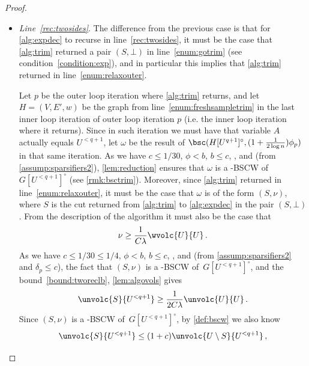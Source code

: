 \begin{proof}
\begin{itemize}
		\item \emph{Line~\eqref{rec:twosides}}. The difference from the previous case is that for \cref{alg:expdec} to recurse in line~\eqref{rec:twosides}, it must be the case that \cref{alg:trim} returned a pair $(S,\bot)$ in line~\eqref{enum:gotrim} (see condition~\eqref{condition:exp}), and in particular this implies that \cref{alg:trim} returned in line~\eqref{enum:relaxouter}.
		
		Let $p$ be the outer loop iteration where \cref{alg:trim} returns, and let $H=(V,E',w)$ be the graph from line~\eqref{enum:freshsampletrim} in the last inner loop iteration of outer loop iteration $p$ (i.e. the inner loop iteration where it returns). Since in such iteration we must have that variable $A$ actually equals $U^{<q+1} $, let $\omega$ be the result of $\bsc(H[U^{q+1}]^\circ, (1+\frac{1}{2 \log n})\phi_{p})$ in that same iteration.
		As we have $ c \le 1/30$, $\phi < b$, $b \le c$, , and  (from \cref{assump:sparsifiers2}), \cref{lem:reduction} ensures that $\omega$ is a -BSCW of~$G[U^{<q+1}]^\circ$ (see \cref{rmk:bsctrim}). Moreover, since \cref{alg:trim} returned in line~\eqref{enum:relaxouter}, it must be the case that $\omega$ is of the form $(S,\nu)$, where $S$ is the cut returned from \cref{alg:trim} to \cref{alg:expdec} in the pair $(S,\bot)$. From the description of the algorithm it must also be the case that
		\begin{equation}
			\label{bound:tworeclb}
			\nu \ge \frac{1}{C\lambda} \wvolc{U}{U} \, .
		\end{equation}
		As we have $c \le 1/30 \le 1/4$, $\phi < b$, $b \le c$, , and  (from \cref{assump:sparsifiers2} and $\delta_p \le c$), the fact that $(S,\nu)$ is a -BSCW of~$G[U^{<q+1}]^\circ$, and the bound~\eqref{bound:tworeclb}, \cref{lem:algovols} gives
		\begin{equation}
			\label{bound:tworeclbactual}
			\unvolc{S}{U^{<q+1}} \ge \frac{1}{2C\lambda} \unvolc{U}{U} \, .
		\end{equation}
		Since $(S,\nu)$ is a -BSCW of~$G[U^{<q+1}]^\circ$, by \cref{def:bscw} we also know
		\begin{equation*}
			\unvolc{S}{U^{<q+1}} \le (1+c) \unvolc{U \setminus S}{U^{<q+1}} \, ,

\end{equation*}
\end{itemize}
\end{proof}
